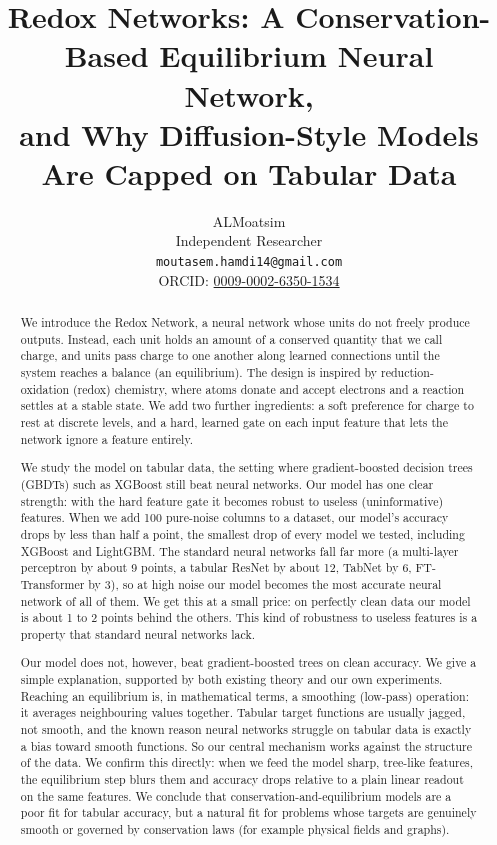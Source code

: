 \documentclass[11pt]{article}
\title{Redox Networks: A Conservation-Based Equilibrium Neural Network,\\
and Why Diffusion-Style Models Are Capped on Tabular Data}
\author{ALMoatsim\\
Independent Researcher\\
\texttt{moutasem.hamdi14@gmail.com}\\
ORCID: \href{https://orcid.org/0009-0002-6350-1534}{0009-0002-6350-1534}}
\date{}
\begin{document}
\maketitle

\begin{abstract}
We introduce the Redox Network, a neural network whose units do not freely produce outputs.
Instead, each unit holds an amount of a conserved quantity that we call charge, and units
pass charge to one another along learned connections until the system reaches a balance (an
equilibrium). The design is inspired by reduction-oxidation (redox) chemistry, where atoms
donate and accept electrons and a reaction settles at a stable state. We add two further
ingredients: a soft preference for charge to rest at discrete levels, and a hard, learned
gate on each input feature that lets the network ignore a feature entirely.

We study the model on tabular data, the setting where gradient-boosted decision trees
(GBDTs) such as XGBoost still beat neural networks. Our model has one clear strength: with
the hard feature gate it becomes robust to useless (uninformative) features. When we add 100
pure-noise columns to a dataset, our model's accuracy drops by less than half a point, the
smallest drop of every model we tested, including XGBoost and LightGBM. The standard neural
networks fall far more (a multi-layer perceptron by about 9 points, a tabular ResNet by
about 12, TabNet by 6, FT-Transformer by 3), so at high noise our model becomes the most
accurate neural network of all of them. We get this at a small price: on perfectly clean
data our model is about 1 to 2 points behind the others. This kind of robustness to useless
features is a property that standard neural networks lack.

Our model does not, however, beat gradient-boosted trees on clean accuracy. We give a simple
explanation, supported by both existing theory and our own experiments. Reaching an
equilibrium is, in mathematical terms, a smoothing (low-pass) operation: it averages
neighbouring values together. Tabular target functions are usually jagged, not smooth, and
the known reason neural networks struggle on tabular data is exactly a bias toward smooth
functions. So our central mechanism works against the structure of the data. We confirm this
directly: when we feed the model sharp, tree-like features, the equilibrium step blurs them
and accuracy drops relative to a plain linear readout on the same features. We conclude that
conservation-and-equilibrium models are a poor fit for tabular accuracy, but a natural fit
for problems whose targets are genuinely smooth or governed by conservation laws (for
example physical fields and graphs).
\end{abstract}
\end{document}
